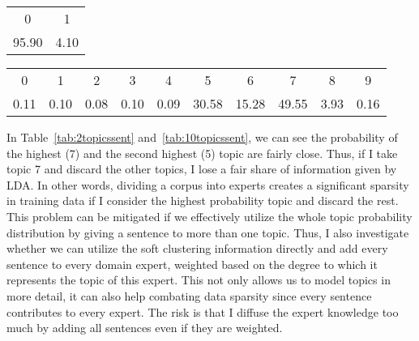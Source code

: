 \begin{table*}[!htb]
\centering

\caption{2 topics distribution}
\begin{tabular}{cc}
\\ \hline
0 & 1 \\
95.90 & 4.10 \\ \hline
\end{tabular}
\label{tab:2topicssent}

\caption{10 topics distribution
}
\begin{tabular}{cccccccccc}
\\ \hline

0 & \multicolumn{1}{c}{1} & \multicolumn{1}{c}{2} & \multicolumn{1}{c}{3} & \multicolumn{1}{c}{4} & \multicolumn{1}{c}{5} & \multicolumn{1}{c}{6} & \multicolumn{1}{c}{7} & \multicolumn{1}{c}{8} & \multicolumn{1}{c}{9} \\
0.11 & 0.10 & 0.08 & 0.10 & 0.09 & 30.58 & 15.28 & 49.55 & 3.93 & 0.16 \\ \hline
\end{tabular}
\label{tab:10topicssent}

\end{table*}
 
In Table~\ref{tab:2topicssent} and~\ref{tab:10topicssent}, we can see the probability of the highest (7) and the second highest (5) topic are fairly close. Thus, if I take topic 7 and discard the other topics, I lose a fair share of information given by LDA. In other words, dividing a corpus into experts creates a significant sparsity in training data if I consider the highest probability topic and discard the rest.
This problem can be mitigated if we effectively utilize the whole topic probability distribution by giving a sentence to more than one topic. Thus, I also investigate whether we can utilize the soft clustering information directly and add every sentence to every domain expert, weighted based on the degree to which it represents the topic of this expert. This not only allows us to model topics in more detail, it can also help combating data sparsity since every sentence contributes to every expert. The risk is that I diffuse the expert knowledge too much by adding all sentences even if they are weighted. 



